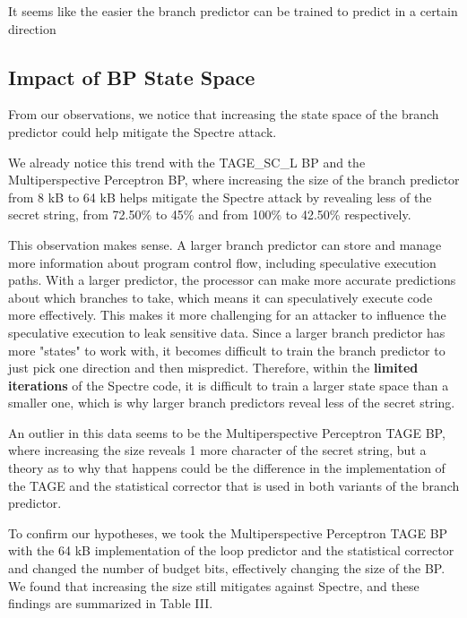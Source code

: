 \documentclass[twocolumn,showpacs,%
  nofootinbib,aps,superscriptaddress,%
  eqsecnum,prd,notitlepage,showkeys,10pt]{revtex4-1}
\begin{document}
It seems like the easier the branch predictor can be trained to predict in a certain direction

\subsection{Impact of BP State Space}

From our observations, we notice that increasing the state space of the branch predictor could help mitigate the Spectre attack.

We already notice this trend with the TAGE\_SC\_L BP and the Multiperspective Perceptron BP, where increasing the size of the branch predictor from 8 kB to 64 kB helps mitigate the Spectre attack by revealing less of the secret string, from 72.50\% to 45\% and from 100\% to 42.50\% respectively.

This observation makes sense. A larger branch predictor can store and manage more information about program control flow, including speculative execution paths. With a larger predictor, the processor can make more accurate predictions about which branches to take, which means it can speculatively execute code more effectively. This makes it more challenging for an attacker to influence the speculative execution to leak sensitive data. Since a larger branch predictor has more "states" to work with, it becomes difficult to train the branch predictor to just pick one direction and then mispredict. Therefore, within the \textbf{limited iterations} of the Spectre code, it is difficult to train a larger state space than a smaller one, which is why larger branch predictors reveal less of the secret string. 

An outlier in this data seems to be the Multiperspective Perceptron TAGE BP, where increasing the size reveals 1 more character of the secret string, but a theory as to why that happens could be the difference in the implementation of the TAGE and the statistical corrector that is used in both variants of the branch predictor.

To confirm our hypotheses, we took the Multiperspective Perceptron TAGE BP with the 64 kB implementation of the loop predictor and the statistical corrector and changed the number of budget bits, effectively changing the size of the BP. We found that increasing the size still mitigates against Spectre, and these findings are summarized in Table III.
\end{document}
